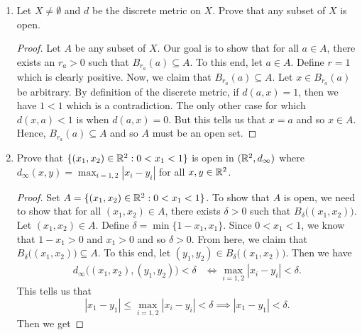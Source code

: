 \documentclass[a4paper]{article}
\begin{document}
\begin{problem}
   \begin{enumerate}
       \item[(i)] Let \( X \neq \emptyset  \) and \( d  \) be the discrete metric on \( X  \). Prove that any subset of \( X  \) is open.
           \begin{proof}
           Let \( A  \) be any subset of \( X  \). Our goal is to show that for all \( a \in A  \), there exists an \( {r}_{a} > 0  \) such that \( {B}_{{r}_{a}}(a) \subseteq A \). To this end, let \( a \in A  \).  Define \( r  = 1  \) which is clearly positive. Now, we claim that \( {B}_{{r}_{a}}(a) \subseteq  A  \). Let \( x \in  {B}_{{r}_{a}}(a) \) be arbitrary. By definition of the discrete metric, if \( d(a,x) = 1  \), then we have \( 1 < 1  \) which is a contradiction. The only other case for which \( d(x,a) < 1  \) is when \( d(a,x) = 0  \). But this tells us that \( x = a  \) and so \( x \in A  \). Hence, \( {B}_{{r}_{a}}(a) \subseteq A \) and so \( A  \) must be an open set. 
           \end{proof}
       \item[(ii)] Prove that \( \{ ({x}_{1}, {x}_{2}) \in \mathbb{R}^{2} : 0 < {x}_{1} < 1  \}  \) is open in \( (\mathbb{R}^{2}, {d}_{\infty })  \) where \( {d}_{\infty }(x,y) = \max_{i=1,2} | {x}_{i} - {y}_{i} |  \) for all \( x,y \in \mathbb{R}^{2} \).
           \begin{proof}
           Set \( A =  \{ ({x}_{1}, {x}_{2}) \in \mathbb{R}^{2} : 0 < {x}_{1} < 1  \}   \). To show that \( A  \) is open, we need to show that for all \( ({x}_{1}, {x}_{2}) \in A  \), there exists \( \delta > 0  \) such that \( {B}_{\delta}\big( ({x}_{1}, {x}_{2}) \big) \). Let \( ({x}_{1}, {x}_{2}) \in A  \). Define \( \delta = \min \{  1 - {x}_{1}, {x}_{1} \}  \). Since \( 0 < {x}_{1} < 1   \), we know that \( 1 - {x}_{1} > 0  \) and \( {x}_{1} > 0  \) and so \( \delta > 0 \). From here, we claim that \( {B}_{\delta}\big( ({x}_{1}, {x}_{2}) \big) \subseteq A  \). To this end, let \( ({y}_{1}, {y}_{2}) \in {B}_{\delta}\big( ({x}_{1}, {x}_{2}) \big) \). Then we have 
        \begin{align*}
            {d}_{\infty } \Big( ({x}_{1}, {x}_{2}), ({y}_{1}, {y}_{2}) \Big) < \delta &\iff \max_{i = 1,2} | {x}_{i} - {y}_{i} | < \delta.
        \end{align*}
        This tells us that 
        \[ | {x}_{1} - {y}_{1} |  \leq \max_{i = 1,2} | {x}_{i} - {y}_{i} |  < \delta \implies | {x}_{1} - {y}_{1}  | < \delta. \]
        Then we get

\end{proof}
\end{enumerate}
\end{problem}
\end{document}
